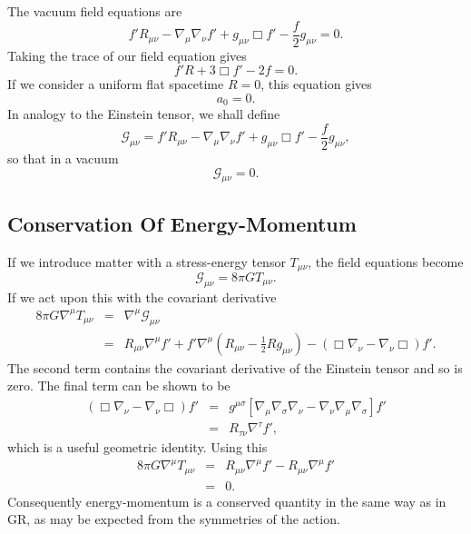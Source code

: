 \documentclass[aps,prd,reprint,showpacs]{revtex4-1}
\newcommand{\recip}[1]{\ensuremath{\frac{1}{#1}}}
\begin{document}
The vacuum field equations are
\begin{equation}
f'R_{\mu\nu} - \nabla_\mu\nabla_\nu f' + g_{\mu\nu}\Box f' - \frac{f}{2}g_{\mu\nu} = 0.
\label{eq:Field_eq}
\end{equation}
Taking the trace of our field equation gives
\begin{equation}
f'R + 3\Box f' - 2f = 0.
\label{eq:Trace_eq}
\end{equation}
If we consider a uniform flat spacetime $R = 0$, this equation gives
\begin{equation}
a_0 = 0.
\label{eq:a_0}
\end{equation}
In analogy to the Einstein tensor, we shall define
\begin{equation}
\mathcal{G}_{\mu\nu} = f'R_{\mu\nu} - \nabla_\mu\nabla_\nu f' + g_{\mu\nu}\Box f' - \frac{f}{2}g_{\mu\nu},
\label{eq:G_tensor}
\end{equation}
so that in a vacuum
\begin{equation}
\mathcal{G}_{\mu\nu} = 0.
\end{equation}

\subsection{Conservation Of Energy-Momentum}

If we introduce matter with a stress-energy tensor $T_{\mu\nu}$, the field equations become
\begin{equation}
\mathcal{G}_{\mu\nu} = 8\pi GT_{\mu\nu}.
\end{equation}
If we act upon this with the covariant derivative
\begin{eqnarray}
8\pi G\nabla^\mu T_{\mu\nu} & = & \nabla^\mu\mathcal{G}_{\mu\nu} \nonumber \\
& = & R_{\mu\nu}\nabla^\mu f' + f'\nabla^\mu\left(R_{\mu\nu} - \recip{2}R g_{\mu\nu}\right) - \left(\Box\nabla_\nu - \nabla_\nu\Box\right)f'.
\end{eqnarray}
The second term contains the covariant derivative of the Einstein tensor and so is zero. The final term can be shown to be
\begin{eqnarray}
\left(\Box\nabla_\nu - \nabla_\nu\Box\right)f' & = & g^{\mu\sigma}\left[\nabla_\mu\nabla_\sigma\nabla_\nu - \nabla_\nu\nabla_\mu\nabla_\sigma\right]f' \nonumber \\
 & = & R_{\tau\nu}\nabla^\tau f',
\end{eqnarray}
which is a useful geometric identity\cite{Koivisto2006a}. Using this
\begin{eqnarray}
8\pi G\nabla^\mu T_{\mu\nu} & = & R_{\mu\nu}\nabla^\mu f' - R_{\mu\nu}\nabla^\mu f' \nonumber \\
 & = & 0.
\end{eqnarray}
Consequently energy-momentum is a conserved quantity in the same way as in GR, as may be expected from the symmetries of the action.
\end{document}
